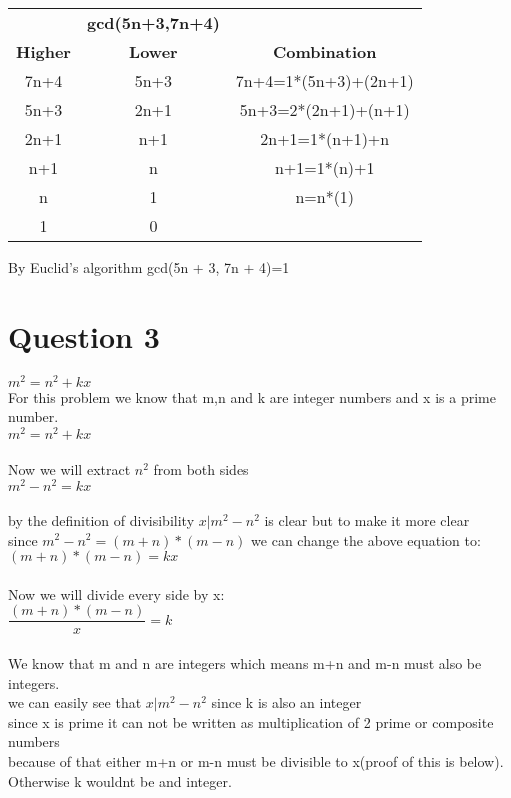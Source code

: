 \documentclass[12pt]{article}
\begin{document}
\begin{center}
\begin{tabular}{ c c c }
& \textbf{gcd(5n+3,7n+4)} &\\ \cline{2-2}
\textbf{Higher} &\textbf{Lower} &\textbf{Combination} \\ \cline{1-3}
7n+4&    5n+3  &      7n+4=1*(5n+3)+(2n+1)\\
5n+3 &   2n+1 &       5n+3=2*(2n+1)+(n+1)\\
2n+1  &  n+1 &        2n+1=1*(n+1)+n\\
n+1    & n  &         n+1=1*(n)+1\\
n  &     1 &          n=n*(1)\\
1   &    0&
\end{tabular}
\end{center}

By Euclid's algorithm gcd(5n + 3, 7n + 4)=1\\

\section*{Question 3}

$m^{2}=n^{2}+kx$\\
For this problem we know that m,n and k are integer numbers and x is a prime number.\\
$m^{2}=n^{2}+kx$\\
\\
Now we will extract $n^{2}$ from both sides\\
$m^{2}-n^{2}=kx$\\
\\
by the definition of divisibility $x|m^{2}-n^{2}$ is clear but to make it more clear\\
since $m^{2}-n^{2}=(m+n)*(m-n)$ we can change the above equation to:\\
$(m+n)*(m-n)=kx$\\
\\
Now we will divide every side by x:\\
$\dfrac{(m+n)*(m-n)}{x}=k$\\
\\
We know that m and n are integers which means m+n and m-n must also be integers. \\
we can easily see that $x|m^{2}-n^{2}$ since k is also an integer\\
since x is prime it can not be written as multiplication of 2 prime or composite numbers\\
because of that either m+n or m-n must be divisible to x(proof of this is below). Otherwise k wouldnt be and integer.\\
\end{document}
